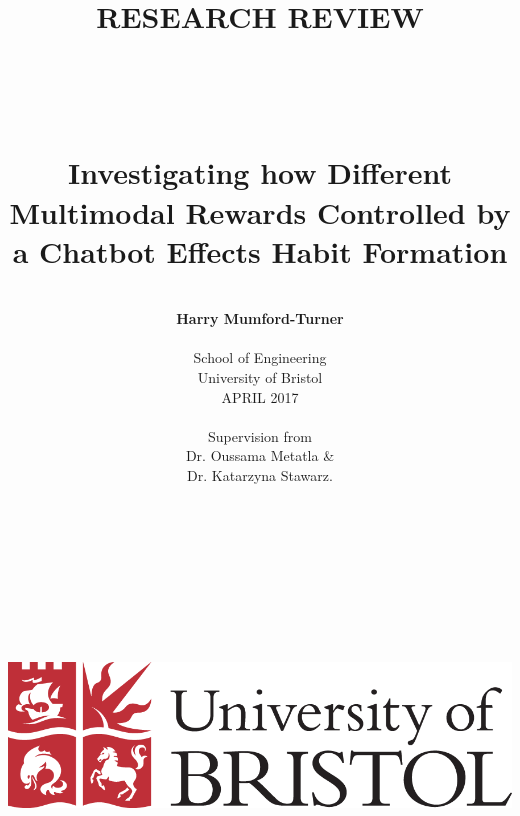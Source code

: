 \title{\\
\\
\large{\newline \newline
RESEARCH REVIEW}
\\
\huge{\textbf{\\\\\\Investigating how Different Multimodal Rewards Controlled by a Chatbot Effects Habit Formation}}}
\author{\\
\textbf{Harry Mumford-Turner}\\
\\
School of Engineering\\
University of Bristol\\
APRIL 2017\\
\\
Supervision from\\
Dr. Oussama Metatla \&\\Dr. Katarzyna Stawarz.
\\
\\\\
\\
\\
\\
\\
\\
\\
\\
\includegraphics[scale=0.29]{resources/UoB-logo.png}}
